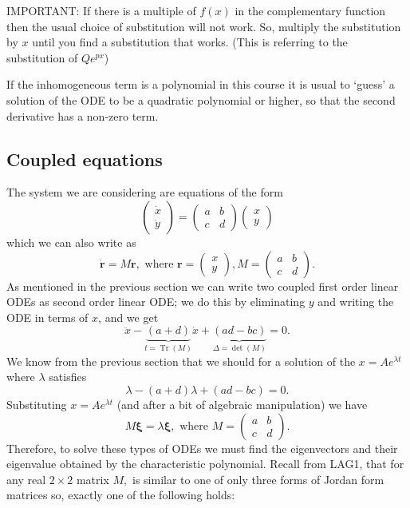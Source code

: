 \documentclass[12pt, a4paper]{article}
\DeclareMathOperator{\Trace}{Tr}
\begin{document}
\begin{mdnote}
IMPORTANT: If there is a multiple of $f(x)$ in the complementary function then the usual choice of substitution will not work. So, multiply the substitution by $x$ until you find a substitution that works. (This is referring to the substitution of $Qe^{px}$)
\end{mdnote}

\begin{mdremark}
If the inhomogeneous term is a polynomial in this course it is usual to `guess' a solution of the ODE to be a quadratic polynomial or higher, so that the second derivative has a non-zero term.
\end{mdremark}

\subsection{Coupled equations}

The system we are considering are equations of the form $$\begin{pmatrix} \dot{x} \\ \dot{y} \end{pmatrix} = \begin{pmatrix} a&b \\ c&d \end{pmatrix} \begin{pmatrix} x\\y \end{pmatrix}$$ which we can also write as $$\dot{\bm{r}}=M\bm{r}, \text{ where } \bm{r}=\begin{pmatrix} x\\y \end{pmatrix}, M=\begin{pmatrix} a&b \\ c&d \end{pmatrix}.$$ As mentioned in the previous section we can write two coupled first order linear ODEs as second order linear ODE; we do this by eliminating $y$ and writing the ODE in terms of $x$, and we get $$\ddot{x}-\underbrace{(a+d)}_{t=\Trace(M)}\dot{x}+\underbrace{(ad-bc)}_{\Delta=\det(M)}=0.$$ We know from the previous section that we should for a solution of the $x=Ae^{\lambda t}$ where $\lambda$ satisfies $$\lambda-(a+d)\lambda+(ad-bc)=0.$$ Substituting $x=Ae^{\lambda t}$ (and after a bit of algebraic manipulation) we have $$M\bm{\xi}=\lambda\bm{\xi}, \text{ where } M= \begin{pmatrix} a&b \\ c&d \end{pmatrix}.$$ Therefore, to solve these types of ODEs we must find the eigenvectors and their eigenvalue obtained by the characteristic polynomial. Recall from LAG1, that for any real $2\times 2$ matrix $M,$ is similar to one of only three forms of Jordan form matrices so, exactly one of the following holds:
\end{document}
